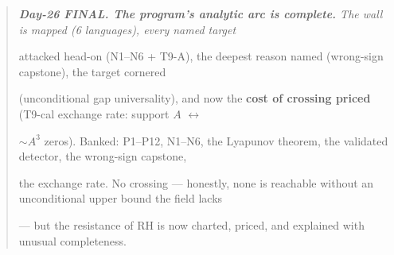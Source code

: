 \documentclass[10pt]{article}
\begin{document}
\begin{quote}\itshape
\textbf{Day-26 FINAL. The program's analytic arc is complete.} The wall is mapped (6 languages), every named target\par
attacked head-on (N1--N6 + T9-A), the deepest reason named (wrong-sign capstone), the target cornered\par
(unconditional gap universality), and now the \textbf{cost of crossing priced} (T9-cal exchange rate: support $A$ \ensuremath{\leftrightarrow}\par
$\sim A^3$ zeros). Banked: P1--P12, N1--N6, the Lyapunov theorem, the validated detector, the wrong-sign capstone,\par
the exchange rate. No crossing --- honestly, none is reachable without an unconditional upper bound the field lacks\par
--- but the resistance of RH is now charted, priced, and explained with unusual completeness.\par
\end{quote}
\end{document}
